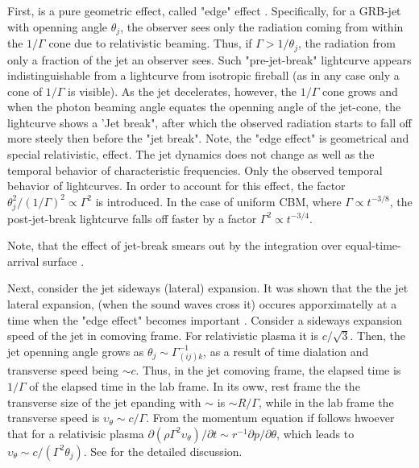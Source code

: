 First, is a pure geometric effect, called "edge" effect \cite{(e.g.Meszaros and Rees, 1999; Panaitescu and Meszaros, 1999; Rhoads, 1999; Sari et al., 1999}. Specifically, for a GRB-jet with openning angle $\theta_j$, the observer sees only the radiation coming from within the $1/\Gamma$ cone due to relativistic beaming. Thus, if $\Gamma > 1/\theta_j$, the radiation from only a fraction of the jet an observer sees. Such "pre-jet-break" lightcurve appears indistinguishable from a lightcurve from isotropic fireball (as in any case only a cone of $1/\Gamma$ is visible). 
As the jet decelerates, however, the $1/\Gamma$ cone grows and when the photon beaming angle equates the openning angle of the jet-cone, the lightcurve shows a 'Jet break", after which the observed radiation starts to fall off more steely then before the "jet break". 
Note, the "edge effect" is geometrical and special relativistic, effect. The jet dynamics does not change as well as the temporal behavior of characteristic frequencies. Only the observed temporal behavior of lightcurves. 
In order to account for this effect, the factor $\theta^2_j/(1/\Gamma)^2 \propto \Gamma^2$ is introduced.
In the case of uniform CBM, where $\Gamma\propto t^{-3/8}$, the post-jet-break lightcurve falls off faster by a factor $\Gamma^2\propto t^{-3/4}$.

Note, that the effect of jet-break smears out by the integration over equal-time-arrival surface \cite{Kumar and Panaitescu, 2000b; Piran, 2000; Granot and Piran, 2012}.


Next, consider the jet sideways (lateral) expansion.
It was shown that the the jet lateral expansion, (when the sound waves cross it) occures apporximatelly at a time when the "edge effect" becomes important \cite{Rhoads (1999) and Sari et al. (1999)}.
Consider a sideways expansion speed of the jet in comoving frame. For relativistic plasma it is $c/\sqrt{3}$. Then, the jet openning angle grows as $\theta_j\sim\Gamma_{(ij)k}^{-1}$, as a result of time dialation and transverse speed being $\sim c$. Thus, in the jet comoving frame, the elapsed time is $1/\Gamma$ of the elapsed time in the lab frame. In its oww, rest frame the the transverse size of the jet epanding with $\sim$ is $\sim R/\Gamma$, while in the lab frame the transverse speed is $\upsilon_{\theta}\sim c/\Gamma$.
From the momentum equation if follows hwoever that for a relativisic plasma $\partial(\rho\Gamma^2\upsilon_{\theta})/\partial t \sim r^{-1}\partial p / \partial\theta$, which leads to $\upsilon_{\theta}\sim c/(\Gamma^2\theta_j)$.
See \cite{Kumar and Granot (2003)} \cite{Granot and Piran (2012)} for the detailed discussion.

